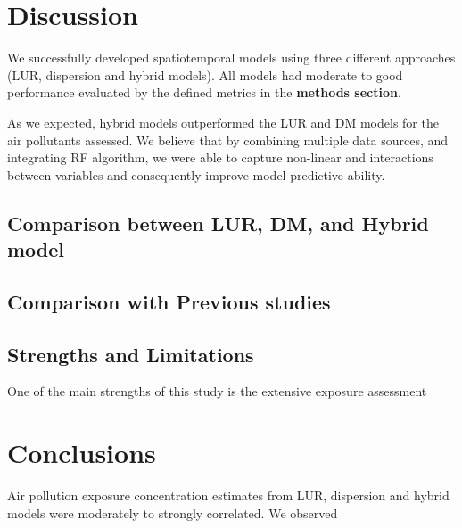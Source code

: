 \documentclass{article}
\begin{document}
\section{Discussion}
We successfully developed spatiotemporal models using three different approaches (LUR, dispersion and hybrid models). All models had moderate to good performance evaluated by the defined metrics in the \textbf{methods section}.

As we expected, hybrid models outperformed the LUR and DM models for the air pollutants assessed. We believe that by combining multiple data sources, and integrating RF algorithm, we were able to capture non-linear and interactions between variables and consequently improve model predictive ability. 

\subsection{Comparison between LUR, DM, and Hybrid model}

\subsection{Comparison with Previous studies}

\subsection{Strengths and Limitations}
One of the main strengths of this study is the extensive exposure assessment 

\section{Conclusions}

Air pollution exposure concentration estimates from LUR, dispersion and hybrid models were moderately to strongly correlated. We observed 



































\newpage


\end{document}
